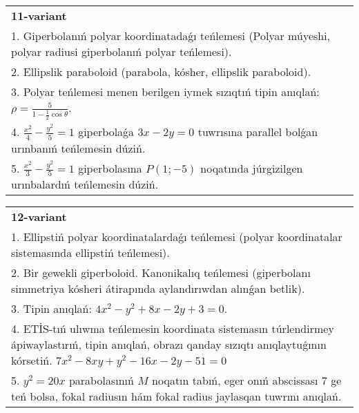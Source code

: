 \documentclass{article}
\begin{document}
\begin{tabular}{m{17cm}}
\textbf{11-variant}\\
1. Giperbolanıń polyar koordinatadaǵı teńlemesi (Polyar múyeshi, polyar radiusi giperbolanıń polyar teńlemesi).\\

2. Ellipslik paraboloid (parabola, kósher, ellipslik paraboloid).\\

3. Polyar teńlemesi menen berilgen iymek sızıqtıń tipin anıqlań: $\rho=\frac{5}{1-\frac{1}{2}\cos\theta}$.\\

4. $\frac{x^{2}}{4} - \frac{y^{2}}{5} = 1$ giperbolaǵa $3x - 2y = 0$ tuwrısına parallel bolǵan urınbanıń teńlemesin dúziń.  \\

5. $\frac{x^{2}}{3} - \frac{y^{2}}{5} = 1$ giperbolasına $P(1; - 5)$ noqatında júrgizilgen urınbalardıń teńlemesin dúziń.
\end{tabular}
\vspace{1cm}


\begin{tabular}{m{17cm}}
\textbf{12-variant}\\
1. Ellipstiń polyar koordinatalardaǵı teńlemesi (polyar koordinatalar sistemasında ellipstiń teńlemesi).\\

2. Bir gewekli giperboloid. Kanonikalıq teńlemesi (giperbolanı simmetriya kósheri átirapında aylandırıwdan alınǵan betlik).\\

3. Tipin anıqlań: $4 x^{2}-y^{2}+8 x-2 y+3=0$.\\

4. ETİS-tıń ulıwma teńlemesin koordinata sistemasın túrlendirmey ápiwaylastırıń, tipin anıqlań, obrazı qanday sızıqtı anıqlaytuǵının kórsetiń. $7x^{2} - 8xy + y^{2} - 16x - 2y - 51 = 0$  \\

5. $y^{2} = 20x$ parabolasınıń $M$ noqatın tabıń, eger onıń abscissası 7 ge teń bolsa, fokal radiusın hám fokal radius jaylasqan tuwrını anıqlań.
\end{tabular}
\vspace{1cm}
\end{document}
